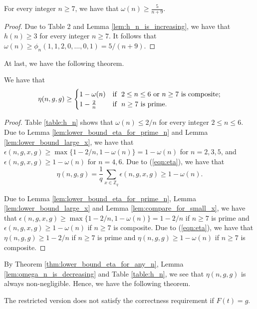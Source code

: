 \documentclass[JMC]{degruyter-journal}
\begin{document}
\begin{lemma}\label{lem:compare_for_small_x}
For every integer $n\geq 7$,
 we have that $\displaystyle \omega(n)\geq  \frac{5}{n+9}$.
\end{lemma}
\begin{proof}
Due to Table 2 and Lemma \ref{lem:h_n_is_increasing}, we have that
$h(n)\geq 3$ for every integer $n\geq 7$. It follows that
$\omega(n)\geq \phi_n(1,1,2,0,\ldots,0,1)=5/(n+9).$
\end{proof}


At last, we have the following theorem.
\begin{theorem}\label{thm:lower_bound_eta_for_any_n}
We have that
\begin{equation*}
\eta(n,g,g)\geq
\begin{cases}
1-\omega(n) & \text{{\rm if~}  $2\leq n\leq 6$ {\rm or $n\geq 7$ is composite;}} \\
1-\frac{2}{n} & \text{{\rm if~}  $n\geq 7$ {\rm is prime}.}
\end{cases}
\end{equation*}
\end{theorem}

\begin{proof}
Table \ref{table:h_n} shows that  $\omega(n)\leq 2/n$ for every integer $2\leq n\leq 6$.
Due to Lemma \ref{lem:lower_bound_eta_for_prime_n} and
Lemma \ref{lem:lower_bound_large_x},
we have that $\epsilon(n,g,x,g)\geq \max\{1-2/n,1-\omega(n)\}=1-\omega(n)$
for $n=2,3,5$,  and $\epsilon(n,g,x,g)\geq 1-\omega(n)$ for $n=4,6$.
Due to  (\ref{eqn:eta}), we have that
$$\eta(n,g,g)=\frac{1}{q}\sum_{x\in \mathbb{Z}_q}\epsilon(n,g,x,g)\geq 1-\omega(n).$$

Due to Lemma \ref{lem:lower_bound_eta_for_prime_n}, Lemma \ref{lem:lower_bound_large_x}
and Lemma \ref{lem:compare_for_small_x},
we have that $\epsilon(n,g,x,g)\geq \max\{1-2/n, 1-\omega(n)\}=
1-2/n$ if $n\geq 7$ is prime
and
$\epsilon(n,g,x,g)\geq 1-\omega(n)$ if $n\geq 7$ is composite.
 Due to  (\ref{eqn:eta}), we have that
 $\eta(n,g,g)\geq 1-2/n$ if $n\geq 7$ is prime and
  $\eta(n,g,g)\geq 1-\omega(n)$ if $n\geq 7$ is composite.
\end{proof}






By Theorem \ref{thm:lower_bound_eta_for_any_n}, Lemma \ref{lem:omega_n_is_decreasing}
and Table \ref{table:h_n},  we see that
$\eta(n,g,g)$ is always non-negligible.
Hence, we have the following theorem.
\begin{theorem}\label{thm:BC_is_not_correct_for_g}
The restricted version  does not satisfy the correctness requirement if $F(t)=g$.
\end{theorem}
\end{document}
